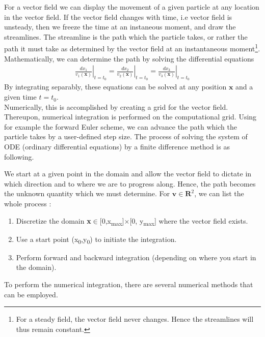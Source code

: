 \documentclass[main.tex]{subfiles}
\begin{document}
For a vector field we can display the movement of a given particle at any 
location in the vector field. If the vector field changes with time, i.e vector field is unsteady, 
then we freeze the time at an instaneous moment, and draw the streamlines. The streamline
is the path which the particle takes, or rather the path it must take as determined by the 
vector field at an instantaneous moment\footnote{For a steady field, the vector field never changes.
Hence the streamlines will thus remain constant.}. 
Mathematically, we can determine the path by solving the differential equations
\begin{align}
\left.\frac{dx_1}{v_1(\mathbf{x})}\right|_{t = t_0} 
= \left.\frac{dx_2}{v_2(\mathbf{x})}\right|_{t = t_0} 
= \left.\frac{dx_3}{v_3(\mathbf{x})}\right|_{t = t_0}
\end{align}
By integrating separably, these equations can be solved at any position $\mathbf{x}$ and a given
time $t = t_0$. 
\\

Numerically, this is accomplished by creating a grid for the vector field. Thereupon,
numerical integration is performed on the computational grid. Using for example the forward 
Euler scheme, we can advance the path which the particle takes by a user-defined step size. 
The process of solving the system of ODE (ordinary differential equations) by a finite difference 
method is as following. 

We start at a given point in the domain and allow the vector field to dictate in
which direction and to where we are to progress along. Hence, the path becomes the unknown 
quantity which we must determine. For $\mathbf{v} \in \mathbf{R}^2$, we can list the whole
process :
\begin{enumerate}
\item Discretize the domain \textbf{x}$\in$[0,{\large x}\textsubscript{max}]$\times$[0,{
\large y}\textsubscript{max}] where the vector field exists.
\item Use a start point ({\large x}\textsubscript{0},{\large y}\textsubscript{0}) 
to initiate the integration.
\item Perform forward and backward integration (depending on where you start in the domain).
\end{enumerate}
To perform the numerical integration, there are several numerical methods that can be employed.
\end{document}
